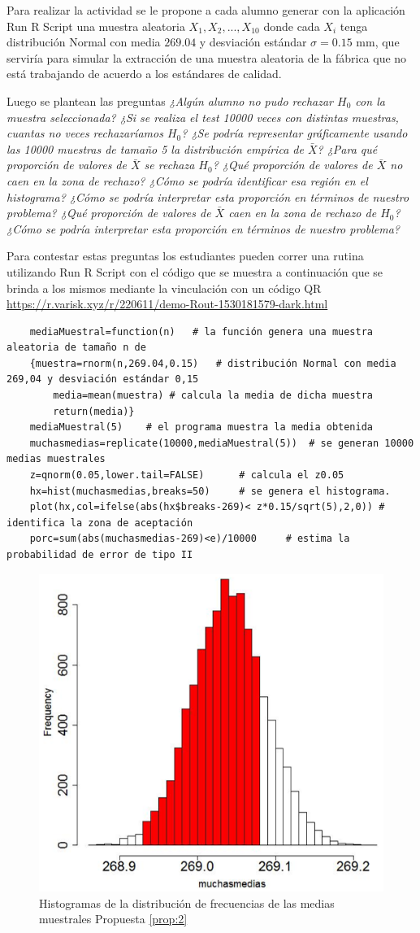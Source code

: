 \documentclass[oneside,spanish]{amsart}
\numberwithin{equation}{section}
\theoremstyle{definition}
\begin{document}
Para realizar la actividad se le propone a cada alumno generar con la aplicación Run R Script una muestra aleatoria $X_1,X_2,..., X_{10}$ donde cada $X_i$ tenga distribución Normal con media $269.04$ y desviación estándar $\sigma = 0.15$ mm, que serviría para simular la extracción de una muestra aleatoria de la fábrica que no está trabajando de acuerdo a los estándares de calidad.

Luego se plantean las preguntas \textit{¿Algún alumno no pudo rechazar $H_0$ con la muestra seleccionada? ¿Si se realiza el test 10000 veces con distintas muestras, cuantas no veces rechazaríamos $H_0$? ¿Se podría representar gráficamente usando las 10000 muestras de tamaño 5 la distribución empírica de $\bar{X}$? ¿Para qué proporción de valores de $\bar{X}$ se rechaza $H_0$? ¿Qué proporción de valores de $\bar{X}$ no caen en la zona de rechazo? ¿Cómo se podría identificar esa región en el histograma? ¿Cómo se podría interpretar esta proporción en términos de nuestro problema? ¿Qué proporción de valores de $\bar{X}$ caen en la zona de rechazo de $H_0$? ¿Cómo se podría interpretar esta proporción en términos de nuestro problema?}

Para contestar estas preguntas los estudiantes pueden correr una rutina utilizando Run R Script con el código que se muestra a continuación que se brinda a los mismos mediante la vinculación con un código QR \url{https://r.varisk.xyz/r/220611/demo-Rout-1530181579-dark.html}

\begin{lstlisting}
	mediaMuestral=function(n)	# la función genera una muestra aleatoria de tamaño n de 
	{muestra=rnorm(n,269.04,0.15)	# distribución Normal con media 269,04 y desviación estándar 0,15
		media=mean(muestra)	# calcula la media de dicha muestra
		return(media)}
	mediaMuestral(5)	# el programa muestra la media obtenida
	muchasmedias=replicate(10000,mediaMuestral(5))	# se generan 10000 medias muestrales  
	z=qnorm(0.05,lower.tail=FALSE)		# calcula el z0.05             
	hx=hist(muchasmedias,breaks=50)		# se genera el histograma.
	plot(hx,col=ifelse(abs(hx$breaks-269)< z*0.15/sqrt(5),2,0))	# identifica la zona de aceptación
	porc=sum(abs(muchasmedias-269)<e)/10000		# estima la probabilidad de error de tipo II
\end{lstlisting}

\begin{figure}[h]
	\centering
	\includegraphics[height=0.4\linewidth]{Anexos-06/Imagen7}
	\caption{Histogramas de la distribución de frecuencias de las medias muestrales Propuesta \ref{prop:2}}
	\label{fig:4}
\end{figure}
\end{document}
